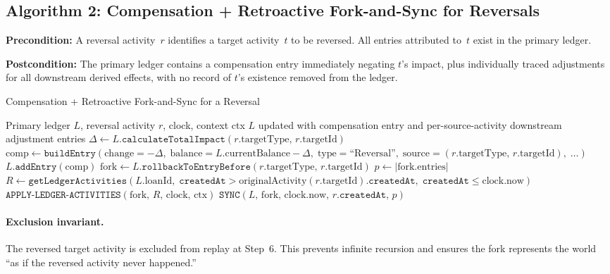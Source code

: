\documentclass[11pt,letterpaper]{article}
\begin{document}
\subsection{Algorithm 2: Compensation + Retroactive Fork-and-Sync for Reversals}
\label{sec:alg-reversal}

\textbf{Precondition:} A reversal activity~$r$ identifies a target
activity~$t$ to be reversed. All entries attributed to~$t$ exist in
the primary ledger.

\textbf{Postcondition:} The primary ledger contains a compensation
entry immediately negating $t$'s impact, plus individually traced
adjustments for all downstream derived effects, with no record of
$t$'s existence removed from the ledger.

\begin{algorithm}[H]
\caption{Compensation + Retroactive Fork-and-Sync for a Reversal}
\label{alg:reversal}
\begin{algorithmic}[1]
\Require Primary ledger $L$, reversal activity $r$, clock, context ctx
\Ensure $L$ updated with compensation entry and per-source-activity
        downstream adjustment entries
\State $\Delta \leftarrow L.\texttt{calculateTotalImpact}(r.\text{targetType},\,r.\text{targetId})$
\State $\text{comp} \leftarrow \texttt{buildEntry}(\text{change} =
       {-}\Delta,\; \text{balance} = L.\text{currentBalance} - \Delta,\;
       \text{type} = \text{``Reversal''},\; \text{source} =
       (r.\text{targetType},\,r.\text{targetId}),\; \ldots)$
\State $L.\texttt{addEntry}(\text{comp})$
\State $\text{fork} \leftarrow L.\texttt{rollbackToEntryBefore}(r.\text{targetType},\,r.\text{targetId})$
\State $p \leftarrow |\text{fork.entries}|$
\State $R \leftarrow \texttt{getLedgerActivities}(L.\text{loanId},\;
       \texttt{createdAt} > \text{originalActivity}(r.\text{targetId}).\texttt{createdAt},\;
       \texttt{createdAt} \leq \text{clock.now})$
\State $\texttt{APPLY-LEDGER-ACTIVITIES}(\text{fork},\,R,\,\text{clock},\,\text{ctx})$
\State $\texttt{SYNC}(L,\,\text{fork},\,\text{clock.now},\,
       r.\texttt{createdAt},\,p)$
\end{algorithmic}
\end{algorithm}

\paragraph{Exclusion invariant.}
The reversed target activity is excluded from replay at Step~6. This
prevents infinite recursion and ensures the fork represents the world
``as if the reversed activity never happened.''
\end{document}

